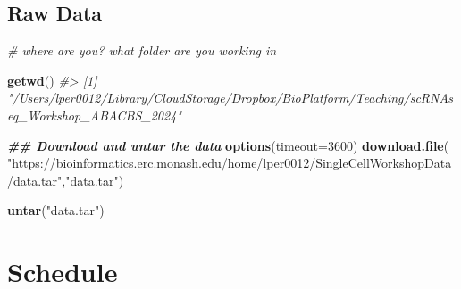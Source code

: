 \documentclass[
]{book}
\newenvironment{Shaded}{\begin{snugshade}}{\end{snugshade}}
\newcommand{\AttributeTok}[1]{\textcolor[rgb]{0.13,0.29,0.53}{#1}}
\newcommand{\CommentTok}[1]{\textcolor[rgb]{0.56,0.35,0.01}{\textit{#1}}}
\newcommand{\DecValTok}[1]{\textcolor[rgb]{0.00,0.00,0.81}{#1}}
\newcommand{\DocumentationTok}[1]{\textcolor[rgb]{0.56,0.35,0.01}{\textbf{\textit{#1}}}}
\newcommand{\FunctionTok}[1]{\textcolor[rgb]{0.13,0.29,0.53}{\textbf{#1}}}
\newcommand{\NormalTok}[1]{#1}
\newcommand{\StringTok}[1]{\textcolor[rgb]{0.31,0.60,0.02}{#1}}
\begin{document}
\section{Raw Data}\label{raw-data}

\begin{Shaded}
\begin{Highlighting}[]
\CommentTok{\# where are you? what folder are you working in}

\FunctionTok{getwd}\NormalTok{()}
\CommentTok{\#\textgreater{} [1] "/Users/lper0012/Library/CloudStorage/Dropbox/BioPlatform/Teaching/scRNAseq\_Workshop\_ABACBS\_2024"}

\DocumentationTok{\#\# Download and untar the data}
\FunctionTok{options}\NormalTok{(}\AttributeTok{timeout=}\DecValTok{3600}\NormalTok{)}
\FunctionTok{download.file}\NormalTok{(}
    \StringTok{"https://bioinformatics.erc.monash.edu/home/lper0012/SingleCellWorkshopData/data.tar"}\NormalTok{,}\StringTok{"data.tar"}\NormalTok{)}

\FunctionTok{untar}\NormalTok{(}\StringTok{"data.tar"}\NormalTok{)}
\end{Highlighting}
\end{Shaded}

\chapter{Schedule}\label{schedule}
\end{document}
